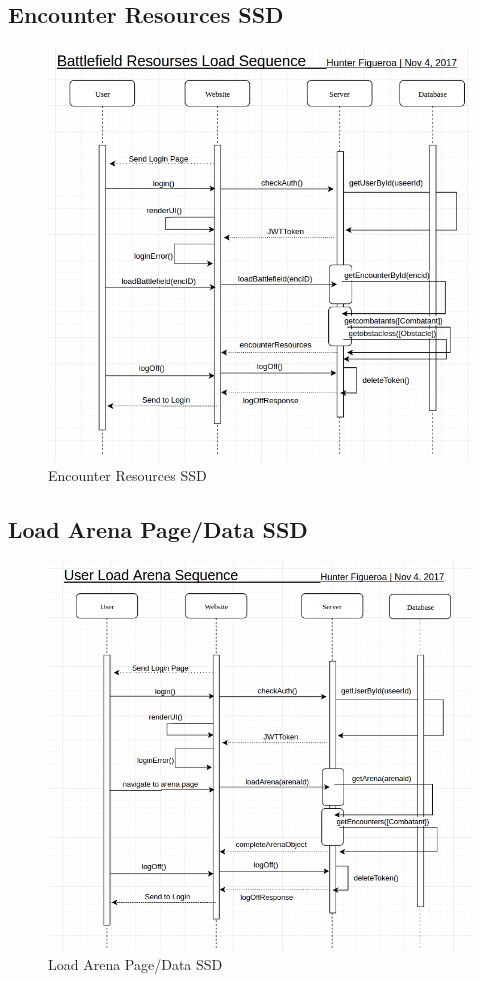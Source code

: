 \documentclass[12pt,a4paper]{report}
\begin{document}
	\newpage
	\subsection {Encounter Resources SSD}
	\begin{figure}[H]
		\centering
		\centerline{\includegraphics[scale=.7, angle=90]{ssd_resourses}}
		\caption{Encounter Resources SSD}
		\label{fig: Encounter Resourses SSD }
	\end{figure}

	\newpage
	\subsection {Load Arena Page/Data SSD}
	\begin{figure}[H]
		\centering
		\centerline{\includegraphics[scale=.7, angle=90]{ssd_arena}}
		\caption{Load Arena Page/Data SSD}
		\label{fig: Load Arena Page/Data SSD }
	\end{figure}
	
\end{document}
